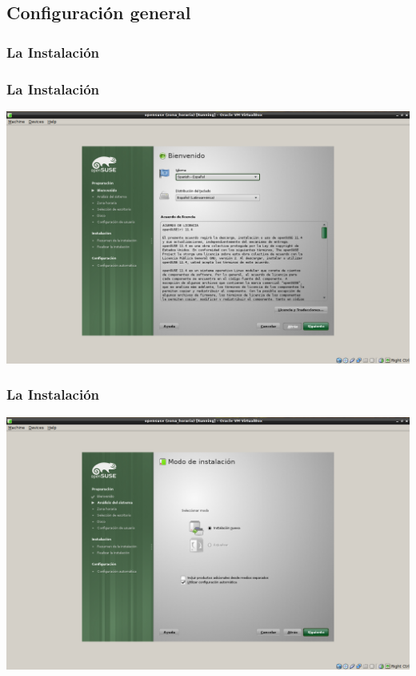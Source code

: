 \documentclass{beamer}
\begin{document}
\subsection{Configuraci\'on general}
\begin{frame}
\frametitle{La Instalaci\'on}
\tableofcontents[currentsection]
\end{frame} 
\begin{frame}
\frametitle{La Instalaci\'on}
\includegraphics[height=0.8\textheight]{0_.png} \hspace*{7.3cm}
\end{frame} 
\begin{frame}
\frametitle{La Instalaci\'on}
\includegraphics[height=0.8\textheight]{1_.png} \hspace*{7.3cm}
\end{frame} 
\end{document}

